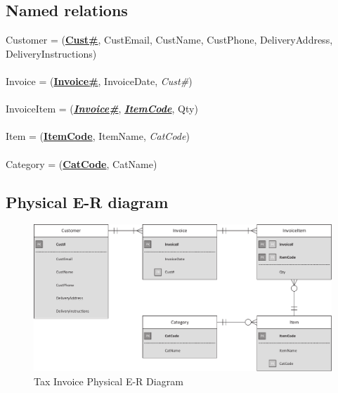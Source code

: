 \subsection{Named relations}

Customer = (\textbf{\underline{Cust\#}}, CustEmail, CustName, CustPhone, DeliveryAddress, DeliveryInstructions)
\\\\
Invoice = (\textbf{\underline{Invoice\#}}, InvoiceDate, \emph{Cust\#})
\\\\
InvoiceItem = (\textbf{\underline{\emph{Invoice\#}}}, \textbf{\underline{\emph{ItemCode}}}, Qty)
\\\\
Item = (\textbf{\underline{ItemCode}}, ItemName, \emph{CatCode})
\\\\
Category = (\textbf{\underline{CatCode}}, CatName)

\subsection{Physical E-R diagram}

\begin{figure}[H]
\centering
\caption{Tax Invoice Physical E-R Diagram}
\includegraphics[scale=0.5]{./img/CSG1207_A1_PONCE_TASK_2_PER_TAXINVOICE.pdf}
\end{figure}